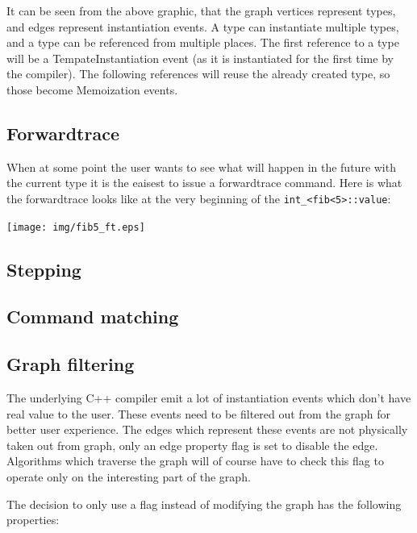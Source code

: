 It can be seen from the above graphic, that the graph vertices represent types,
and edges represent instantiation events. A type can instantiate multiple
types, and a type can be referenced from multiple places. The first reference
to a type will be a TempateInstantiation event (as it is instantiated for the
first time by the compiler). The following references will reuse the already
created type, so those become Memoization events.

\subsection*{Forwardtrace}

When at some point the user wants to see what will happen in the future with
the current type it is the eaisest to issue a forwardtrace command. Here is
what the forwardtrace looks like at the very beginning of the
\lstinline|int_<fib<5>::value|:

\bigskip

\texttt{[image: img/fib5\_ft.eps]}

\subsection*{Stepping}

\subsection*{Command matching}

\subsection*{Graph filtering}

The underlying C++ compiler emit a lot of instantiation events which don't have
real value to the user. These events need to be filtered out from the graph for
better user experience. The edges which represent these events are not
physically taken out from graph, only an edge property flag is set to disable
the edge. Algorithms which traverse the graph will of course have to check this
flag to operate only on the interesting part of the graph.

The decision to only use a flag instead of modifying the graph has the
following properties:

